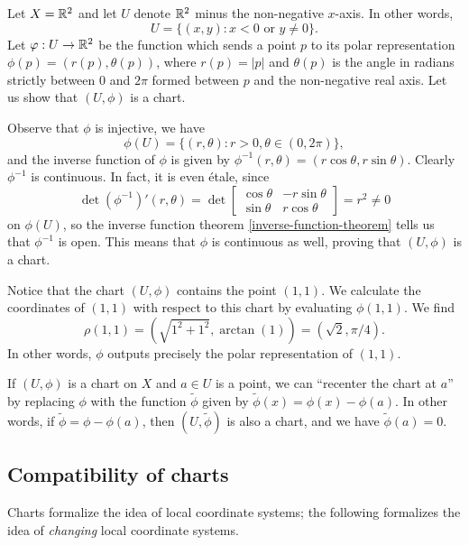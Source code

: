 \begin{example} \label{polar-representation}
	Let $X = \mathbb{R}^2$ and let $U$ denote $\mathbb{R}^2$ minus the non-negative $x$-axis. In other words, 
	\[ U = \{(x,y) : x < 0 \text{ or } y \neq 0 \}. \]
	Let $\varphi : U \to \mathbb{R}^2$ be the function which sends a point $p$ to its polar representation $\phi(p) = (r(p), \theta(p))$, where $r(p) = |p|$ and $\theta(p)$ is the angle in radians strictly between 0 and $2\pi$ formed between $p$ and the non-negative real axis. Let us show that $(U, \phi)$ is a chart. 
	
	Observe that $\phi$ is injective, we have
	\[ \phi(U) = \{ (r, \theta) : r > 0, \theta \in (0, 2\pi) \}, \]
	and the inverse function of $\phi$ is given by  $\phi^{-1}(r,\theta) = (r\cos \theta, r\sin\theta)$. Clearly $\phi^{-1}$ is continuous. In fact, it is even \'etale, since 
	\[ \det (\phi^{-1})'(r, \theta) = \det \begin{bmatrix} \cos \theta & -r\sin\theta \\ \sin\theta & r\cos \theta \end{bmatrix} = r^2 \neq 0 \]
	on $\phi(U)$, so the inverse function theorem \ref{inverse-function-theorem} tells us that $\phi^{-1}$ is open. This means that $\phi$ is continuous as well, proving that $(U, \phi)$ is a chart. 
	
	Notice that the chart $(U, \phi)$ contains the point $(1,1)$. We calculate the coordinates of $(1,1)$ with respect to this chart by evaluating $\phi(1,1)$. We find
	\[ \rho(1,1) = (\sqrt{1^2 + 1^2}, \arctan(1)) = (\sqrt{2}, \pi/4). \]
	In other words, $\phi$ outputs precisely the polar representation of $(1,1)$. 
\end{example}

\begin{remark} \label{recentering-chart}
	If $(U,\phi)$ is a chart on $X$ and $a \in U$  is a point, we can ``recenter the chart at $a$'' by replacing $\phi$ with the function $\tilde{\phi}$ given by $\tilde{\phi}(x) = \phi(x) - \phi(a)$. In other words, if $\tilde{\phi} = \phi - \phi(a)$, then $(U, \tilde{\phi})$ is also a chart, and we have $\tilde{\phi}(a) = 0$.
\end{remark}

\subsection{Compatibility of charts}

Charts formalize the idea of local coordinate systems; the following formalizes the idea of \emph{changing} local coordinate systems. 

